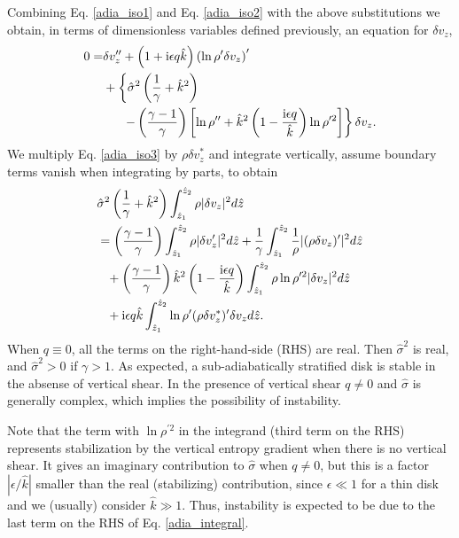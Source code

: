 Combining Eq. \ref{adia_iso1} and Eq. \ref{adia_iso2} with the above
substitutions we obtain, in terms of dimensionless variables defined previously, an equation for $\delta v_z$,
\begin{align}
  0 =& \delta v_z^{\prime\prime} + \left(1 + \mathrm{i} \epsilon q
    \hat{k}\right)\left(\ln\rho^{\prime}\delta v_z\right)^\prime\notag\\
  &+\left\{\hat{\sigma}^2\left(\frac{1}{\gamma}+\hat{k}^2\right)\right.\notag\\
  &\phantom{0=}\left.-\left(\frac{\gamma-1}{\gamma}\right)\left[\ln\rho^{\prime\prime}+\hat{k}^2\left(1-\frac{\mathrm{i}\epsilon
          q}{\hat{k}}\right)\ln\rho^{\prime 2}\right]\right\}\delta v_z.\label{adia_iso3}
\end{align}
We multiply Eq. \ref{adia_iso3} by $\rho\delta v_z^*$ and
integrate vertically, assume boundary terms vanish when integrating by
parts, to obtain
\begin{align}
  &\hat{\sigma}^2\left(\frac{1}{\gamma} +
    \hat{k}^2\right)\int_{\hat{z}_1}^{\hat{z}_2}\rho|\delta
  v_z|^2 d\hat{z} \notag\\
  &=  \left(\frac{\gamma-1}{\gamma}\right)
  \int_{\hat{z}_1}^{\hat{z}_2}\rho|\delta v_z^\prime|^2 d\hat{z}
  +\frac{1}{\gamma}\int_{\hat{z}_1}^{\hat{z}_2}\frac{1}{\rho}|(\rho\delta
  v_z)^\prime|^2 d\hat{z}\notag\\
  &\phantom{=} +
  \left(\frac{\gamma-1}{\gamma}\right)\hat{k}^2\left(1-\frac{\mathrm{i}\epsilon
      q}{\hat{k}}\right) \int_{\hat{z}_1}^{\hat{z}_2}\rho\ln\rho^{\prime
    2}|\delta v_z|^2 d\hat{z}\notag\\
  &\phantom{=} + \mathrm{i}\epsilon q \hat{k}
  \int_{\hat{z}_1}^{\hat{z}_2}\ln\rho^\prime(\rho\delta v_z^*)^\prime
  \delta v_z d\hat{z}.\label{adia_integral}
\end{align}
When $q\equiv0$, all the terms on the right-hand-side (RHS) are real. Then
$\hat{\sigma}^2$ is real, and  $\hat{\sigma}^2>0$ if $\gamma>1$. As
expected, a sub-adiabatically stratified disk is stable in the absense
of vertical shear. In the presence of vertical shear $q\neq0$ and
$\hat{\sigma}$ is generally complex, which implies the possibility of
instability.  

Note that the term with $\ln\rho^{\prime 2}$ in the integrand (third
term on the RHS) represents stabilization by the vertical entropy
gradient when there is no vertical shear. It gives an imaginary
contribution to $\hat{\sigma}$ when $q\neq0$, but this is a factor
$|\epsilon/\hat{k}|$ smaller than the real (stabilizing) contribution,
since $\epsilon\ll 1$ for a thin disk and we (usually) consider
$\hat{k}\gg1$. Thus, instability is expected to be due to the 
last term on the RHS of Eq. \ref{adia_integral}. 
  
